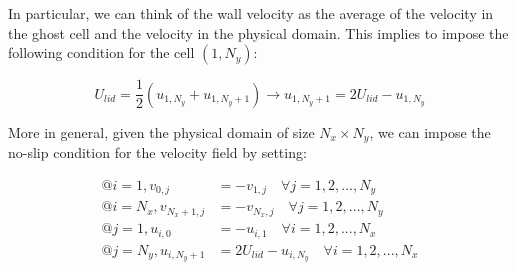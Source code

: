 In particular, we can think of the wall velocity as the average of the velocity in the ghost cell and the velocity in the physical domain.
This implies to impose the following condition for the cell $(1, N_y)$:

\begin{equation}
    U_{lid} = \frac{1}{2} (u_{1, N_y} + u_{1, N_y+1}) \rightarrow u_{1, N_y+1} = 2 U_{lid} - u_{1, N_y}
\end{equation}

More in general, given the physical domain of size $N_x \times N_y$, we can impose the no-slip condition for the velocity field by setting:

\begin{align}
    @i=1, v_{0, j}       & = - v_{1, j} \quad \forall j = 1,2,...,N_y             \\
    @i=N_x, v_{N_x+1, j} & = - v_{N_x, j} \quad \forall j = 1,2,...,N_y           \\
    @j=1, u_{i, 0}       & = - u_{i, 1} \quad \forall i = 1,2,...,N_x             \\
    @j=N_y, u_{i, N_y+1} & = 2 U_{lid} - u_{i, N_y} \quad \forall i = 1,2,...,N_x
\end{align}